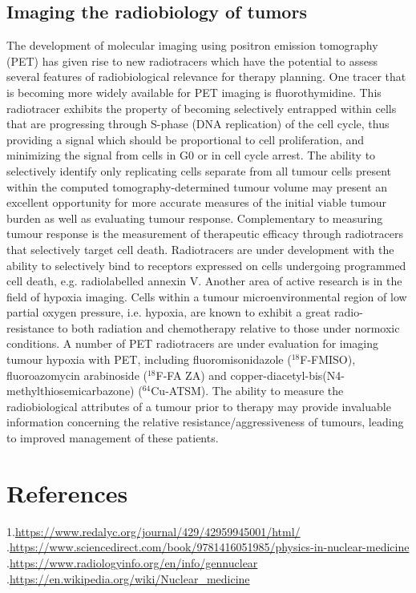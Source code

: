 \documentclass{article}
\begin{document}
\subsection*{Imaging the radiobiology of tumors}
The development of molecular imaging using positron emission tomography
(PET) has given rise to new radiotracers which have the potential to assess
several features of radiobiological relevance for therapy planning. One tracer
that is becoming more widely available for PET imaging is fluorothymidine.
This radiotracer exhibits the property of becoming selectively entrapped within
cells that are progressing through S-phase (DNA replication) of the cell cycle,
thus providing a signal which should be proportional to cell proliferation,
and minimizing the signal from cells in G0 or in cell cycle arrest. The ability to
selectively identify only replicating cells separate from all tumour cells present
within the computed tomography-determined tumour volume may present an
excellent opportunity for more accurate measures of the initial viable tumour
burden as well as evaluating tumour response. Complementary to measuring
tumour response is the measurement of therapeutic efficacy through radiotracers
that selectively target cell death. Radiotracers are under development with the
ability to selectively bind to receptors expressed on cells undergoing programmed
cell death, e.g. radiolabelled annexin V. Another area of active research is in the
field of hypoxia imaging. Cells within a tumour microenvironmental region of low
partial oxygen pressure, i.e. hypoxia, are known to exhibit a great radio-resistance
to both radiation and chemotherapy relative to those under normoxic conditions.
A number of PET radiotracers are under evaluation for imaging tumour
hypoxia with PET, including fluoromisonidazole ($^{18}$F-FMISO), fluoroazomycin
arabinoside ($^{18}$F-FA ZA) and copper-diacetyl-bis(N4-methylthiosemicarbazone)
($^{64}$Cu-ATSM). The ability to measure the radiobiological attributes of a tumour
prior to therapy may provide invaluable information concerning the relative
resistance/aggressiveness of tumours, leading to improved management of these
patients.


\section*{References}


1.\url{https://www.redalyc.org/journal/429/42959945001/html/}
.\url{https://www.sciencedirect.com/book/9781416051985/physics-in-nuclear-medicine
}
.\url{https://www.radiologyinfo.org/en/info/gennuclear}
.\url{https://en.wikipedia.org/wiki/Nuclear_medicine
}
\end{document}
